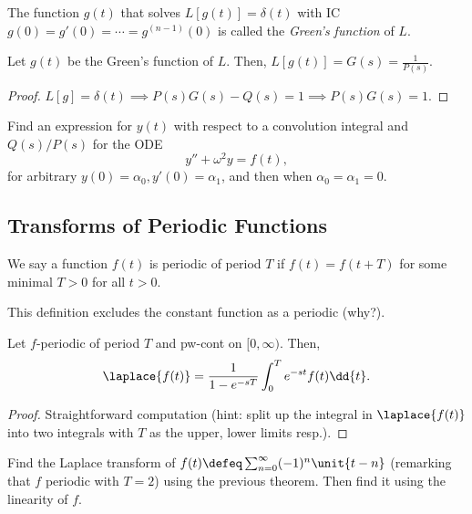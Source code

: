 \begin{definition}
    The function $g(t)$ that solves $L[g(t)] = \delta(t)$ with IC $g(0) = g'(0) = \cdots = g^{(n-1)}(0)$ is called the \emph{Green's function} of $L$.
\end{definition}

\begin{theorem}
    Let $g(t)$ be the Green's function of $L$. Then, $L[g(t)] = G(s) = \frac{1}{P(s)}$.
\end{theorem}

\begin{proof}
    $L[g] = \delta(t) \implies P(s)G(s) - Q(s) = 1 \implies P(s)G(s) = 1$.
\end{proof}

\begin{example}
    Find an expression for $y(t)$ with respect to a convolution integral and $Q(s)/P(s)$ for the ODE\[
    y'' + \omega^2 y = f(t), 
    \]
    for arbitrary $y(0) =\alpha_0, y'(0) = \alpha_1$, and then when $\alpha_0 = \alpha_1 = 0$.
\end{example}

\subsection{Transforms of Periodic Functions}

\begin{definition}
    We say a function $f(t)$ is periodic of period $T$ if $f(t) = f(t + T)$ for some minimal $T > 0$ for all $t > 0$.
\end{definition}
\begin{remark}
    This definition excludes the constant function as a periodic (why?).
\end{remark}

\begin{theorem}
    Let $f$-periodic of period $T$ and pw-cont on $[0, \infty)$. Then, \[
    \laplace{f(t)}     = \frac{1}{1 - e^{-sT}}\int_0^T e^{-st} f(t)\dd{t}.
    \]
\end{theorem}

\begin{proof}
    Straightforward computation (hint: split up the integral in $\laplace{f(t)}$ into two integrals with $T$ as the upper, lower limits resp.).
\end{proof}

\begin{example}
    Find the Laplace transform of $f(t) \defeq \sum_{n=0}^\infty (-1)^n \unit{t - n}$ (remarking that $f$ periodic with $T = 2$) using the previous theorem. Then find it using the linearity of $f$.
\end{example}

